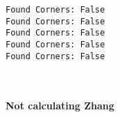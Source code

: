 \documentclass[11pt]{article}
\begin{document}
    \begin{Verbatim}[commandchars=\\\{\}]
Found Corners: False
Found Corners: False
Found Corners: False
Found Corners: False
Found Corners: False

    \end{Verbatim}

    \begin{center}
    \end{center}
    { \hspace*{\fill} \\}
    
    \paragraph{Not calculating Zhang}\label{not-calculating-zhang}


    
    
    
    
\end{document}
